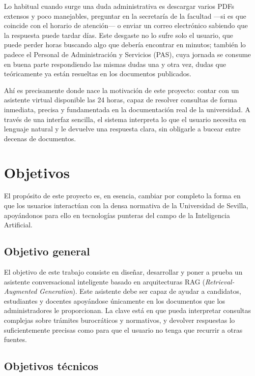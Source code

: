 \documentclass[12pt,a4paper,oneside]{report}
\begin{document}
Lo habitual cuando surge una duda administrativa es descargar varios PDFs extensos y poco manejables, preguntar en la secretaría de la facultad ---si es que coincide con el horario de atención--- o enviar un correo electrónico sabiendo que la respuesta puede tardar días. Este desgaste no lo sufre solo el usuario, que puede perder horas buscando algo que debería encontrar en minutos; también lo padece el Personal de Administración y Servicios (PAS), cuya jornada se consume en buena parte respondiendo las mismas dudas una y otra vez, dudas que teóricamente ya están resueltas en los documentos publicados.

Ahí es precisamente donde nace la motivación de este proyecto: contar con un asistente virtual disponible las 24 horas, capaz de resolver consultas de forma inmediata, precisa y fundamentada en la documentación real de la universidad. A través de una interfaz sencilla, el sistema interpreta lo que el usuario necesita en lenguaje natural y le devuelve una respuesta clara, sin obligarle a bucear entre decenas de documentos.

\section{Objetivos}

El propósito de este proyecto es, en esencia, cambiar por completo la forma en que los usuarios interactúan con la densa normativa de la Universidad de Sevilla, apoyándonos para ello en tecnologías punteras del campo de la Inteligencia Artificial.

\subsection{Objetivo general}

El objetivo de este trabajo consiste en diseñar, desarrollar y poner a prueba un asistente conversacional inteligente basado en arquitecturas RAG (\textit{Retrieval-Augmented Generation}). Este asistente debe ser capaz de ayudar a candidatos, estudiantes y docentes apoyándose únicamente en los documentos que los administradores le proporcionan. La clave está en que pueda interpretar consultas complejas sobre trámites burocráticos y normativos, y devolver respuestas lo suficientemente precisas como para que el usuario no tenga que recurrir a otras fuentes.

\subsection{Objetivos técnicos}
\end{document}
